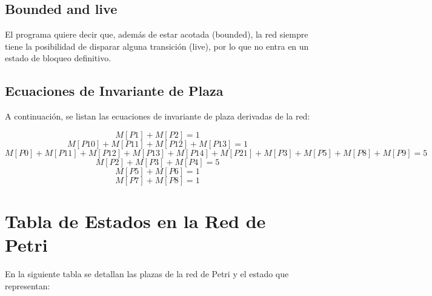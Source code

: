 \documentclass[12pt]{article}
\begin{document}
\subsection{Bounded and live}
El programa quiere decir que, además de estar acotada (bounded), la red siempre tiene la posibilidad de disparar alguna transición (live), por lo que no entra en un estado de bloqueo definitivo.

\subsection{Ecuaciones de Invariante de Plaza}
A continuación, se listan las ecuaciones de invariante de plaza derivadas de la red:

\[
M[P1] + M[P2] = 1
\]
\[
M[P10] + M[P11] + M[P12] + M[P13] = 1
\]
\[
M[P0] + M[P11] + M[P12] + M[P13] + M[P14] + M[P21] + M[P3] + M[P5] + M[P8] + M[P9] = 5
\]
\[
M[P2] + M[P3] + M[P4] = 5
\]
\[
M[P5] + M[P6] = 1
\]
\[
M[P7] + M[P8] = 1
\]

\section{Tabla de Estados en la Red de Petri}
En la siguiente tabla se detallan las plazas de la red de Petri y el estado que representan:
\end{document}
